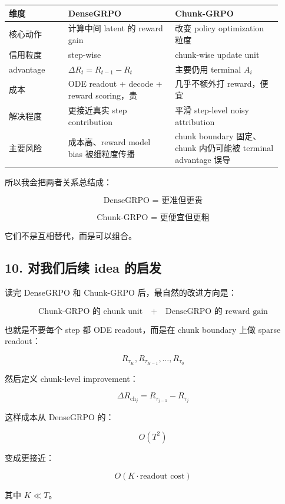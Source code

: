 \begin{center}
{\small
\begin{tabular}{p{0.20\linewidth}p{0.36\linewidth}p{0.36\linewidth}}
\toprule
\textbf{维度} & \textbf{DenseGRPO} & \textbf{Chunk-GRPO} \\
\midrule
核心动作 & 计算中间 latent 的 reward gain & 改变 policy optimization 粒度 \\
信用粒度 & step-wise & chunk-wise update unit \\
advantage & \(\Delta R_t=R_{t-1}-R_t\) & 主要仍用 terminal \(A_i\) \\
成本 & ODE readout + decode + reward scoring，贵 & 几乎不额外打 reward，便宜 \\
解决程度 & 更接近真实 step contribution & 平滑 step-level noisy attribution \\
主要风险 & 成本高、reward model bias 被细粒度传播 & chunk boundary 固定、chunk 内仍可能被 terminal advantage 误导 \\
\bottomrule
\end{tabular}
}
\end{center}

所以我会把两者关系总结成：

\[
\text{DenseGRPO = 更准但更贵}
\]

\[
\text{Chunk-GRPO = 更便宜但更粗}
\]

它们不是互相替代，而是可以组合。

\subsection{10. 对我们后续 idea 的启发}

读完 DenseGRPO 和 Chunk-GRPO 后，最自然的改进方向是：

\[
\text{Chunk-GRPO 的 chunk unit}
\quad + \quad
\text{DenseGRPO 的 reward gain}
\]

也就是不要每个 step 都 ODE readout，而是在 chunk boundary 上做 sparse readout：

\[
R_{\tau_K},R_{\tau_{K-1}},\ldots,R_{\tau_0}
\]

然后定义 chunk-level improvement：

\[
\Delta R_{\mathrm{ch}_j}
=
R_{\tau_{j-1}} - R_{\tau_j}
\]

这样成本从 DenseGRPO 的：

\[
O(T^2)
\]

变成更接近：

\[
O(K\cdot \text{readout cost})
\]

其中 \(K \ll T\)。

